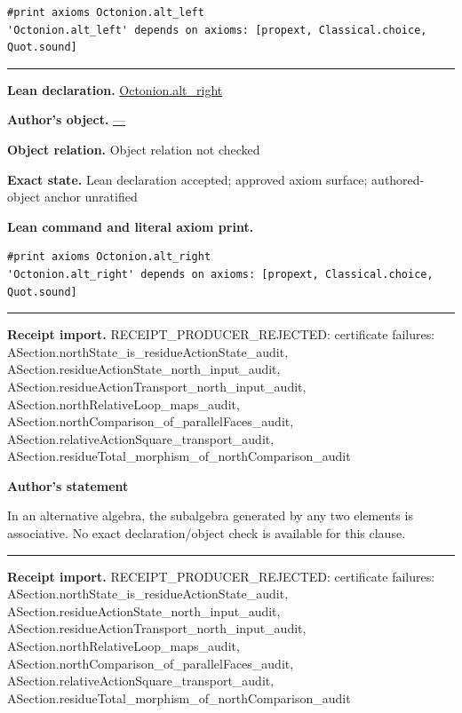 \documentclass[11pt]{article}
\theoremstyle{plain}
\theoremstyle{definition}
\theoremstyle{remark}
\begin{document}
\begin{tcolorbox}[provenancecard,title={8. Definition},title after break={8. Definition (continued)}]
\begin{Verbatim}[breaklines=true,breakanywhere=true,fontsize=\small]
#print axioms Octonion.alt_left
'Octonion.alt_left' depends on axioms: [propext, Classical.choice, Quot.sound]
\end{Verbatim}
\medskip\hrule\medskip
\textbf{Lean declaration.} \url{Octonion.alt_right}
\par\textbf{Author's object.} \url{—}
\par\textbf{Object relation.} Object relation not checked
\par\textbf{Exact state.} Lean declaration accepted; approved axiom surface; authored-object anchor unratified
\par\smallskip\textbf{Lean command and literal axiom print.}
\begin{Verbatim}[breaklines=true,breakanywhere=true,fontsize=\small]
#print axioms Octonion.alt_right
'Octonion.alt_right' depends on axioms: [propext, Classical.choice, Quot.sound]
\end{Verbatim}
\medskip\hrule\medskip
\textbf{Receipt import.} \textcolor{KgtRed}{RECEIPT\_PRODUCER\_REJECTED: certificate failures: ASection.northState\_is\_residueActionState\_audit, ASection.residueActionState\_north\_input\_audit, ASection.residueActionTransport\_north\_input\_audit, ASection.northRelativeLoop\_maps\_audit, ASection.northComparison\_of\_parallelFaces\_audit, ASection.relativeActionSquare\_transport\_audit, ASection.residueTotal\_morphism\_of\_northComparison\_audit}
\end{tcolorbox}
\medskip
\begin{tcolorbox}[provenancecard,title={9. Theorem - Artin \textbackslash{}cite\{Schafer66\}},title after break={9. Theorem - Artin \textbackslash{}cite\{Schafer66\} (continued)}]
\textbf{Author's statement}\par
In an alternative algebra, the subalgebra generated by any two elements is
associative.
\tcblower
\textcolor{KgtRed}{No exact declaration/object check is available for this clause.}
\medskip\hrule\medskip
\textbf{Receipt import.} \textcolor{KgtRed}{RECEIPT\_PRODUCER\_REJECTED: certificate failures: ASection.northState\_is\_residueActionState\_audit, ASection.residueActionState\_north\_input\_audit, ASection.residueActionTransport\_north\_input\_audit, ASection.northRelativeLoop\_maps\_audit, ASection.northComparison\_of\_parallelFaces\_audit, ASection.relativeActionSquare\_transport\_audit, ASection.residueTotal\_morphism\_of\_northComparison\_audit}
\end{tcolorbox}
\medskip
\end{document}

